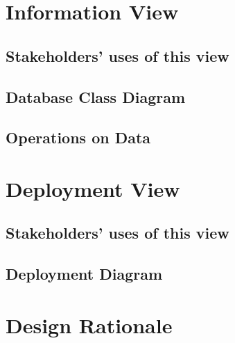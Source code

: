 \section{Information View}

\subsection{Stakeholders' uses of this view}

\subsection{Database Class Diagram}

\subsection{Operations on Data}

\section{Deployment View}

\subsection{Stakeholders' uses of this view}

\subsection{Deployment Diagram}

\section{Design Rationale}